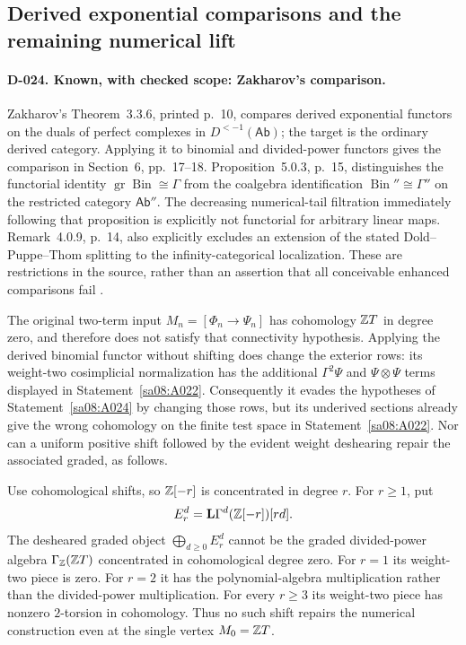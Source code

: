 \subsection{Derived exponential comparisons and the remaining numerical lift}

\paragraph{D-024. Known, with checked scope: Zakharov's comparison.}
Zakharov's Theorem~3.3.6, printed p.~10, compares derived exponential
functors on the duals of perfect complexes in $D^{<-1}(\mathsf{Ab})$;
the target is the ordinary derived category. Applying it to binomial
and divided-power functors gives the comparison in Section~6,
pp.~17--18. Proposition~5.0.3, p.~15, distinguishes the functorial
identity $\operatorname{gr}\operatorname{Bin}\cong\Gamma$ from the
coalgebra identification $\operatorname{Bin}''\cong\Gamma''$ on the
restricted category $\mathsf{Ab}''$. The decreasing numerical-tail
filtration immediately following that proposition is explicitly not
functorial for arbitrary linear maps. Remark~4.0.9, p.~14, also
explicitly excludes an extension of the stated Dold--Puppe--Thom
splitting to the infinity-categorical localization.
These are restrictions in the source, rather than an assertion that
all conceivable enhanced comparisons fail \cite{D_Zakharov2026}.

The original two-term input $M_n=[\Phi_n\to\Psi_n]$ has cohomology
$\mathbb Z T$ in degree zero, and therefore does not satisfy that
connectivity hypothesis. Applying the derived binomial functor
without shifting does change the exterior rows: its weight-two
cosimplicial normalization has the additional $\Gamma^2\Psi$ and
$\Psi\otimes\Psi$ terms displayed in Statement~\ref{sa08:A022}.
Consequently it evades the hypotheses of Statement~\ref{sa08:A024}
by changing those rows, but its underived sections already give the
wrong cohomology on the finite test space in Statement~\ref{sa08:A022}.
Nor can a uniform positive shift followed by the evident weight
deshearing repair the associated graded, as follows.

\begin{proposition}
\label{sa08:D025}
Use cohomological shifts, so $\mathbb Z[-r]$ is concentrated in degree $r$.
For $r\ge1$, put
\[
 E_r^d=\mathbf L\Gamma^d(\mathbb Z[-r])[rd].
\]
The desheared graded object $\bigoplus_{d\ge0}E_r^d$ cannot be the
graded divided-power algebra $\Gamma_{\mathbb Z}(\mathbb Z T)$ concentrated in
cohomological degree zero. For $r=1$ its weight-two piece is zero.
For $r=2$ it has the polynomial-algebra multiplication rather than
the divided-power multiplication. For every $r\ge3$ its weight-two
piece has nonzero $2$-torsion in cohomology.
Thus no such shift repairs the numerical construction even at the
single vertex $M_0=\mathbb Z T$.
\end{proposition}

